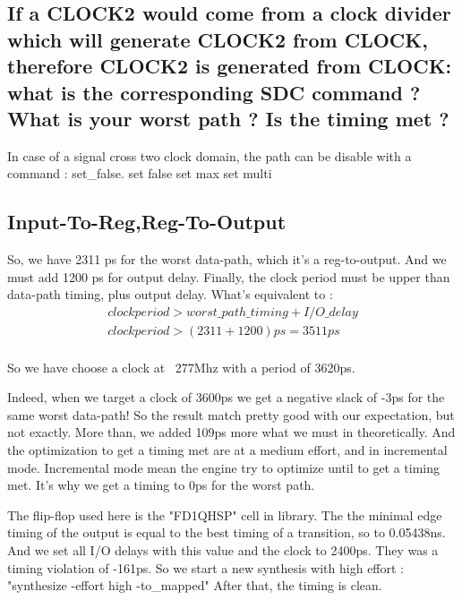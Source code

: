 \subsection*{If a CLOCK2 would come from a clock divider which will generate CLOCK2 from CLOCK, therefore CLOCK2 is generated from CLOCK: what is the corresponding SDC command ?What is your worst path ? Is the timing met ?}

In case of a signal cross two clock domain, the path can be disable with a command : set\_false.
set false
set max
set multi



\subsection*{Input-To-Reg,Reg-To-Output}

So, we have 2311 ps for the worst data-path, which it's a reg-to-output. And we must add 1200 ps for output delay. Finally, the clock period must be upper than data-path timing, plus output delay. What's equivalent to : 
\begin{gather}
clock period > worst\_path\_timing + I/O\_delay\\
clock period > (2311+1200)ps = 3511ps
\end{gather}\\
So we have choose a clock at ~277Mhz with a period of 3620ps.

Indeed, when we target a clock of 3600ps we get a negative slack of -3ps for the same worst data-path! So the result match pretty good with our expectation, but not exactly. More than, we added 109ps more what we must in theoretically.
And the optimization to get a timing met are at a medium effort, and in incremental mode. Incremental mode mean the engine try to optimize until to get a timing met. It's why we get a timing to 0ps for the worst path.

The flip-flop used here is the "FD1QHSP" cell in library. The the minimal edge timing of the output is equal to the best timing of a transition, so to 0.05438ns.
And we set all I/O delays with this value and the clock to 2400ps. They was a timing violation of -161ps. So we start a new synthesis with high effort :
{\colorbox{Gray!50}{\textcolor{RubineRed}{"synthesize -effort high -to\_mapped"}}}
After that, the timing is clean.





